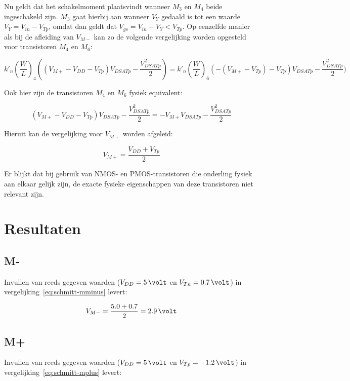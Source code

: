 \documentclass{scrartcl}  %
\begin{document}
Nu geldt dat het schakelmoment plaatsvindt wanneer $M_{3}$ en $M_{4}$ beide ingeschakeld zijn. $M_{3}$ gaat hierbij aan wanneer $V_{Y}$ gedaald is tot een waarde $V_{Y} = V_{in} - V_{Tp}$, omdat dan geldt dat $V_{gs} = V_{in} - V_{Y} < V_{Tp}$. Op eenzelfde manier als bij de afleiding van $V_{M-}$ kan zo de volgende vergelijking worden opgesteld voor transistoren $M_{4}$ en $M_{6}$:

$$k'_{n}(\frac{W}{L})_{4}((V_{M+}-V_{DD}-V_{Tp})V_{DSATp} - \frac{V^{2}_{DSATp}}{2}) = k'_{n}(\frac{W}{L})_{6}(-(V_{M+}-V_{Tp})-V_{Tp})V_{DSATp} - \frac{V^{2}_{DSATp}}{2})$$

Ook hier zijn de transistoren $M_{4}$ en $M_{6}$ fysiek equivalent:

$$(V_{M+}-V_{DD}-V_{Tp})V_{DSATp} - \frac{V^{2}_{DSATp}}{2} = -V_{M+}V_{DSATp} - \frac{V^{2}_{DSATp}}{2}$$

Hieruit kan de vergelijking voor $V_{M+}$ worden afgeleid:

\begin{equation} \label{eq:schmitt-mplus}
V_{M+} = \frac{V_{DD}+V_{Tp}}{2}
\end{equation}

Er blijkt dat bij gebruik van NMOS- en PMOS-transistoren die onderling fysiek aan elkaar gelijk zijn, de exacte fysieke eigenschappen van deze transistoren niet relevant zijn.

\section{Resultaten}
\label{sec:trig-res}
\subsection{M-}
\label{subsec:trig-res-mminus}
Invullen van reeds gegeven waarden ($V_{DD} = 5 \,\volt$ en $V_{Tn} = 0.7 \,\volt$) in vergelijking~\ref{eq:schmitt-mminus} levert:

\begin{equation} \label{eq:schmitt-mminus-val}
V_{M-} = \frac{5.0+0.7}{2} = 2.9 \,\volt
\end{equation}

\subsection{M+}
\label{subsec:trig-res-mplus}
Invullen van reeds gegeven waarden ($V_{DD} = 5 \,\volt$ en $V_{Tp} = -1.2 \,\volt$) in vergelijking~\ref{eq:schmitt-mplus} levert:
\end{document}
